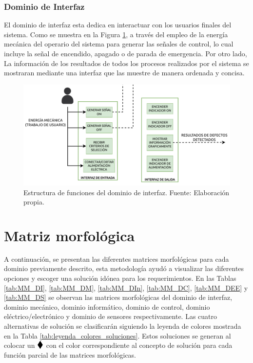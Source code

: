 \subsubsection{Dominio de Interfaz}

El dominio de interfaz esta dedica en interactuar con los usuarios finales del sistema. Como se muestra en la Figura \ref{fig:EF_DI}, a través del empleo de la energía mecánica del operario del sistema para generar las señales de control, lo cual incluye la señal de encendido, apagado o de parada de emergencia. Por otro lado, La información de los resultados de todos los procesos realizados por el sistema se mostraran mediante una interfaz que las muestre de manera ordenada y concisa.

\begin{figure}[h]
	\centering
	\includegraphics[width=\textwidth]{img/EF_DI.pdf}
	\caption[Estructura de funciones del dominio de interfaz.]{Estructura de funciones del dominio de interfaz. Fuente: Elaboración propia.}
	\label{fig:EF_DI}
\end{figure}

\section{Matriz morfológica}

A continuación, se presentan las diferentes matrices morfológicas para cada dominio previamente descrito, esta metodología ayudó a visualizar las diferentes opciones y escoger una solución idónea para los requerimientos. En las Tablas \ref{tab:MM_DI}, \ref{tab:MM_DM}, \ref{tab:MM_DIn}, \ref{tab:MM_DC}, \ref{tab:MM_DEE} y \ref{tab:MM_DS} se observan las matrices morfológicas del dominio de interfaz, dominio mecánico, dominio informático, dominio de control, dominio eléctrico/electrónico y dominio de sensores respectivamente. 
Las cuatro alternativas de solución se clasificarán siguiendo la leyenda de colores mostrada en la Tabla \ref{tab:leyenda_colores_soluciones}. Estos soluciones se generan al colocar un $\B{\blacklozenge}{1.35}$ con el color correspondiente al concepto de solución para cada función parcial de las matrices morfológicas.

